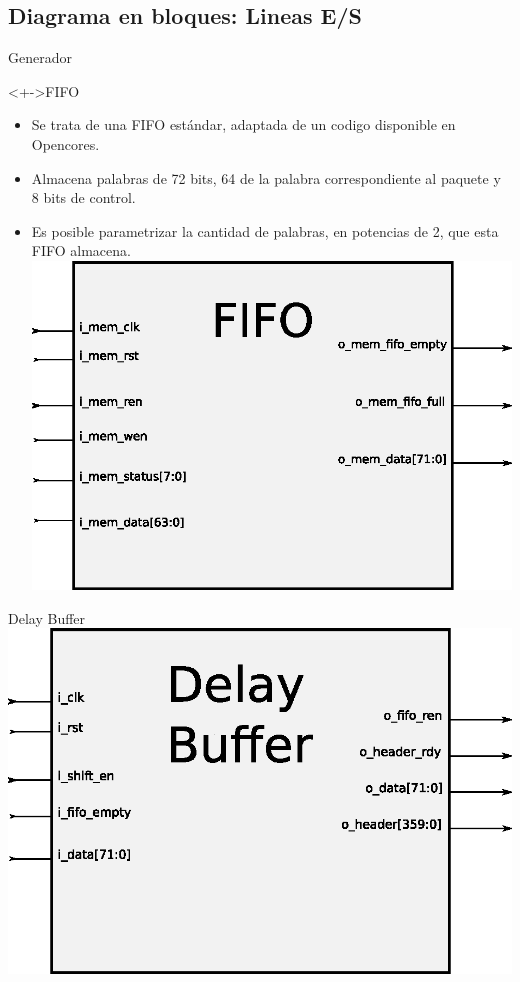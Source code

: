 \documentclass[xcolor=dvipsnames]{beamer}
\begin{document}
\subsection{Diagrama en bloques: Lineas E/S}
\begin{frame}{Generador}
  \begin{block}<+->{FIFO}
	\begin{itemize}
      \scriptsize
	\item Se trata de una FIFO estándar, adaptada de un codigo disponible en Opencores.
	\item Almacena palabras de 72 bits, 64 de la palabra correspondiente al paquete y 8  bits de control.
	\item Es posible parametrizar la cantidad de palabras, en potencias de 2, que esta FIFO almacena.
	\center
	\includegraphics[scale=0.40]{figures/bloqfifo.eps}
	   \end{itemize}
\end{block}

\end{frame}


\begin{frame}{Delay Buffer}
\center 
\includegraphics[scale=0.60]{figures/bloqdelaybuffer.eps}
\end{frame}
\end{document}
